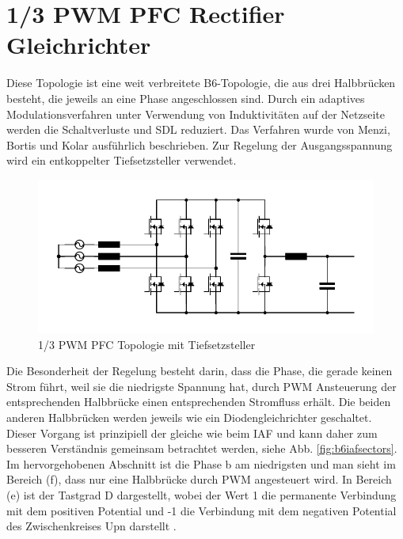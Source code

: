 \section{1/3 PWM PFC Rectifier Gleichrichter}
	\label{sec:GrundlagenB6}
	Diese Topologie ist eine weit verbreitete B6-Topologie, die aus drei Halbbrücken besteht, die jeweils an eine Phase angeschlossen sind. Durch ein adaptives Modulationsverfahren unter Verwendung von Induktivitäten auf der Netzseite werden die Schaltverluste und \gls{SDL} reduziert. Das Verfahren wurde von Menzi, Bortis und Kolar \cite{13PWMPFC} ausführlich beschrieben. Zur Regelung der Ausgangsspannung wird ein entkoppelter Tiefsetzsteller verwendet.\\
	
	\begin{figure}
		\centering
		\includegraphics[width=0.9\linewidth]{content/Grafiken/B6_Buck}
		\caption[1/3 PWM PFC Topologie mit Tiefsetzsteller]{1/3 PWM PFC Topologie mit Tiefsetzsteller}
		\label{fig:b6buck}
	\end{figure}
	
	Die Besonderheit der Regelung besteht darin, dass die Phase, die gerade keinen Strom führt, weil sie die niedrigste Spannung hat, durch \gls{PWM} Ansteuerung der entsprechenden Halbbrücke einen entsprechenden Stromfluss erhält. Die beiden anderen Halbbrücken werden jeweils wie ein Diodengleichrichter geschaltet. Dieser Vorgang ist prinzipiell der gleiche wie beim \gls{IAF} und kann daher zum besseren Verständnis gemeinsam betrachtet werden, siehe Abb. \ref{fig:b6iafsectors}.
	Im hervorgehobenen Abschnitt ist die Phase b am niedrigsten und man sieht im Bereich (f), dass nur eine Halbbrücke durch \gls{PWM} angesteuert wird. In Bereich (e) ist der Tastgrad \gls{D} dargestellt, wobei der Wert 1 die permanente Verbindung mit dem positiven Potential und -1 die Verbindung mit dem negativen Potential des Zwischenkreises \gls{Upn} darstellt \cite{13PWMPFC}.\\ 
		
